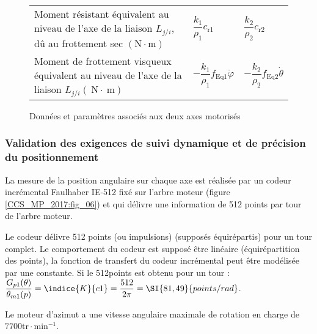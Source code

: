 \begin{figure}[!h]
\begin{tabular}{p{8cm}ll}
Moment résistant équivalent au niveau de l'axe de 
la liaison $L_{j / i}$, dû au frottement sec $(\mathrm{N} \cdot \mathrm{m})$  & 
$\dfrac{k_{1}}{\rho_{1}} c_{\mathrm{r} 1}$ 
& $\dfrac{k_{2}}{\rho_{2}} c_{\mathrm{r} 2}$ \\


Moment de frottement visqueux équivalent au  niveau de l'axe de la liaison $L_{j / i}(\mathrm{~N} \cdot \mathrm{~m})$  & 
$-\dfrac{k_{1}}{\rho_{1}} f_{\mathrm{Eq} 1} \dot{\varphi}$ & 
$-\dfrac{k_{2}}{\rho_{2}} f_{\mathrm{Eq} 2} \dot{\theta}$ \\
\hline
\end{tabular}
\caption{Données et paramètres associés aux deux axes motorisés \label{CCS_MP_2017:fig_11}}
\end{figure}


\subsubsection{ Validation des exigences de suivi dynamique et de précision du positionnement}
La mesure de la position angulaire sur chaque axe est réalisée par un codeur incrémental Faulhaber IE-512 fixé sur l'arbre moteur (figure \ref{CCS_MP_2017:fig_06}) et qui délivre une information de 512 points par tour de l'arbre moteur.\\

\ifprof
\begin{corrige}
Le codeur délivre 512 points (ou impulsions) (supposés équirépartis) pour un tour complet. Le comportement du codeur est supposé être linéaire (équirépartition des points), la fonction de transfert du codeur incrémental peut être modélisée par une constante. Si le 512\ieme  points est obtenu pour un tour :
$\dfrac{G_{p1}  (\theta)}{\theta_{m1}  (p)}=\indice{K}{c1} =\dfrac{512}{2\pi} =\SI{81,49}{points/rad}$. 

\end{corrige}
\else
\fi

Le moteur d'azimut a une vitesse angulaire maximale de rotation en charge de $7700 \mathrm{tr} \cdot \mathrm{min}^{-1}$.\\

